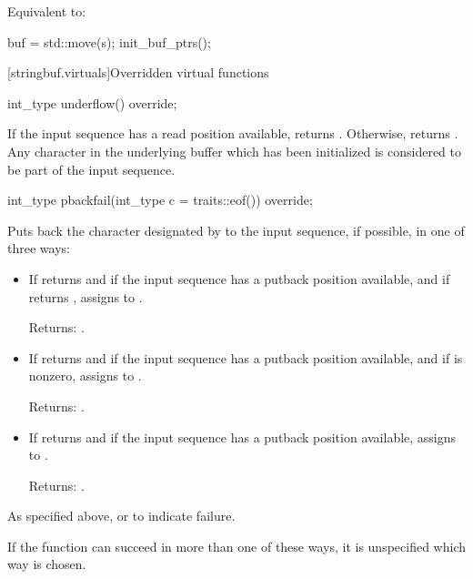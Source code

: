 \begin{itemdescr}
\pnum
\effects
Equivalent to:
\begin{codeblock}
buf = std::move(s);
init_buf_ptrs();
\end{codeblock}
\end{itemdescr}

[stringbuf.virtuals]{Overridden virtual functions}

%
\begin{itemdecl}
int_type underflow() override;
\end{itemdecl}

\begin{itemdescr}
\pnum
\returns
If the input sequence has a read position available,
returns
.
Otherwise, returns
.
Any character in the underlying buffer which has been initialized is considered
to be part of the input sequence.
\end{itemdescr}

%
\begin{itemdecl}
int_type pbackfail(int_type c = traits::eof()) override;
\end{itemdecl}

\begin{itemdescr}
\pnum
\effects
Puts back the character designated by  to the input
sequence, if possible, in one of three ways:
\begin{itemize}
\item
If
returns
and
if the input sequence has a putback position available, and
if
returns
,
assigns
to
.

Returns:
.
\item
If
returns
and if the input sequence
has a putback position available, and
if 
\tcode{\&}
 is
nonzero,
assigns  to
.

Returns:
.
\item
If
returns
and if the input sequence has a putback position available,
assigns
to
.

Returns:
.
\end{itemize}

\pnum
\returns
As specified above, or
to indicate failure.

\pnum
\remarks
If the function can succeed in more than one of these ways, it is
unspecified which way is chosen.
%
\end{itemdescr}

